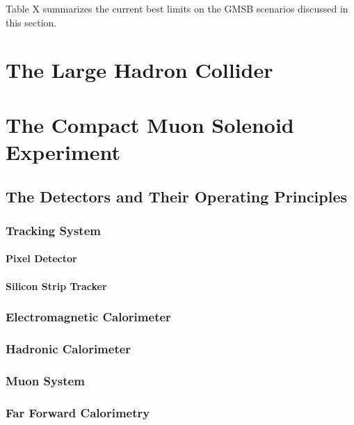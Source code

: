 \documentclass[12pt, letterpaper]{report}
\begin{document}

Table X summarizes the current best limits on the GMSB scenarios discussed in this section.



\chapter{The Large Hadron Collider}

\chapter{The Compact Muon Solenoid Experiment}
\section{The Detectors and Their Operating Principles}
\subsection{Tracking System}
\subsubsection{Pixel Detector}
\subsubsection{Silicon Strip Tracker}
\subsection{Electromagnetic Calorimeter}
\subsection{Hadronic Calorimeter}
\subsection{Muon System}
\subsection{Far Forward Calorimetry}
\end{document}
